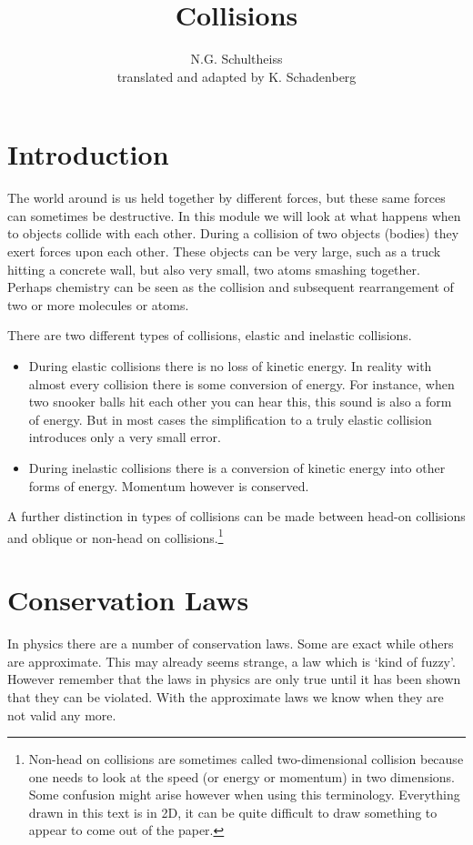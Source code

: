 \documentclass[12pt,a4paper]{article}
\author{N.G. Schultheiss \\ translated and adapted by K. Schadenberg}
\date{}
\title{Collisions}
\numberwithin{equation}{section}
\numberwithin{figure}{section}
\numberwithin{table}{section}
\begin{document}
\maketitle

\section{Introduction}
The world around is us held together by different forces, but these same forces can sometimes be destructive. In this module we will look at what happens when to objects collide with each other. During a collision of two objects (bodies) they exert forces upon each other. These objects can be very large, such as a truck hitting a concrete wall, but also very small, two atoms smashing together. Perhaps chemistry can be seen as the collision and subsequent rearrangement of two or more molecules or atoms.

There are two different types of collisions, elastic and inelastic collisions.
\begin{itemize}
\item During elastic collisions there is no loss of kinetic energy. In reality with almost every collision there is some conversion of energy. For instance, when two snooker balls hit each other you can hear this, this sound is also a form of energy. But in most cases the simplification to a truly elastic collision introduces only a very small error.
\item During inelastic collisions there is a conversion of kinetic energy into other forms of energy. Momentum however is conserved.
\end{itemize}

A further distinction in types of collisions can be made between head-on collisions and oblique or non-head on collisions.\footnote{Non-head on collisions are sometimes called two-dimensional collision because one needs to look at the speed (or energy or momentum) in two dimensions. Some confusion might arise however when using this terminology. Everything drawn in this text is in 2D, it can be quite difficult to draw something to appear to come out of the paper.} 

\section{Conservation Laws}
In physics there are a number of conservation laws. Some are exact while others are approximate. This may already seems strange, a law which is `kind of fuzzy'. However remember that the laws in physics are only true until it has been shown that they can be violated. With the approximate laws we know when they are not valid any more.
\end{document}
